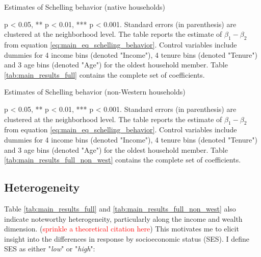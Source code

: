 \documentclass[../main.tex]{subfiles}
\begin{document}
\begin{table}[H]
    \caption{Estimates of Schelling behavior (native households)}
    \label{tab:main_results_native}
    \begin{adjustbox}{width = \linewidth, center}
        
    \begin{threeparttable}
            
    \begin{tablenotes}[flushleft]
    \item \scriptsize * p < 0.05, ** p < 0.01, *** p < 0.001. Standard errors (in parenthesis) are clustered at the neighborhood level. The table reports the estimate of $\beta_1 - \beta_2$ from equation \ref{eq:main_eq_schelling_behavior}. Control variables include dummies for 4 income bins (denoted "Income"), 4 tenure bins (denoted "Tenure") and 3 age bins (denoted "Age") for the oldest household member. Table \ref{tab:main_results_full} contains the complete set of coefficients.
    \end{tablenotes}
    \end{threeparttable}
    \end{adjustbox}
\end{table}

\begin{table}[H]
    \caption{Estimates of Schelling behavior (non-Western households)}
    \label{tab:main_results_non_west}
    \begin{adjustbox}{width = \linewidth, center}
    
    \begin{threeparttable}
            
    \begin{tablenotes}[flushleft]
    \item \scriptsize * p < 0.05, ** p < 0.01, *** p < 0.001. Standard errors (in parenthesis) are clustered at the neighborhood level. The table reports the estimate of $\beta_1 - \beta_2$ from equation \ref{eq:main_eq_schelling_behavior}. Control variables include dummies for 4 income bins (denoted "Income"), 4 tenure bins (denoted "Tenure") and 3 age bins (denoted "Age") for the oldest household member. Table \ref{tab:main_results_full_non_west} contains the complete set of coefficients.
    \end{tablenotes}
    \end{threeparttable}
    \end{adjustbox}    
\end{table}

\subsection{Heterogeneity}
Table \ref{tab:main_results_full} and \ref{tab:main_results_full_non_west} also indicate noteworthy heterogeneity, particularly along the income and wealth dimension. (\textcolor{red}{sprinkle a theoretical citation here}) This motivates me to elicit insight into the differences in response by socioeconomic status (SES). I define SES as either "\textit{low}" or "\textit{high}": 
\end{document}
